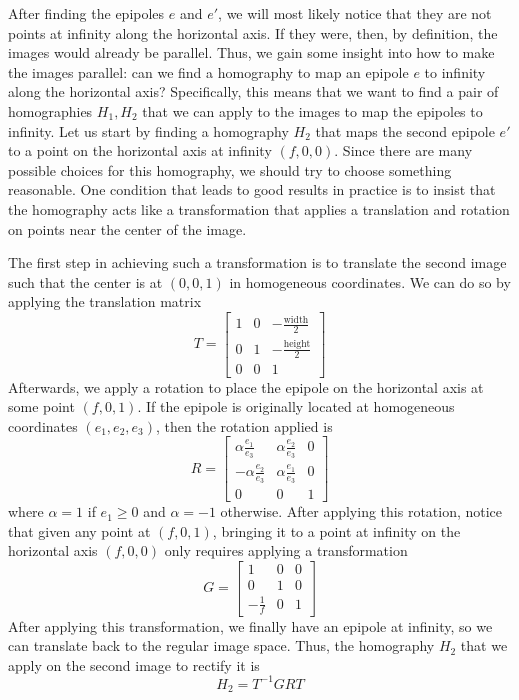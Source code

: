 \documentclass[a4paper, 12pt]{article}
\begin{document}
After finding the epipoles $e$ and $e'$, we will most likely notice that they are not points at infinity along the horizontal axis. If they were, then, by definition, the images would already be parallel. Thus, we gain some insight into how to make the images parallel: can we find a homography to map an epipole $e$ to infinity along the horizontal axis? Specifically, this means that we want to find a pair of homographies $H_1, H_2$ that we can apply to the images to map the epipoles to infinity. Let us start by finding a homography $H_2$ that maps the second epipole $e'$ to a  point on the horizontal axis at infinity $(f,0,0)$. Since there are many possible choices for this homography, we should try to choose something reasonable. One condition that leads to good results in practice is to insist that the homography acts like a transformation that applies a translation and rotation on points near the center of the image. 

The first step in achieving such a transformation is to translate the second image such that the center is at $(0,0,1)$ in homogeneous coordinates. We can do so by applying the translation matrix
\begin{equation}
    T = \begin{bmatrix}
    1&0&-\frac{\mathrm{width}}{2}\\0&1&-\frac{\mathrm{height}}{2}\\ 0 &0 &1
    \end{bmatrix}
\end{equation}
Afterwards, we apply a rotation to place the epipole on the horizontal axis at some point $(f,0,1)$. If the epipole is originally located at homogeneous coordinates $(e_1, e_2, e_3)$, then the rotation applied is
\begin{equation}
    R = 
    \begin{bmatrix}
    \alpha\frac{e_1}{e_3} & \alpha\frac{e_2}{e_3} & 0 \\ -\alpha\frac{e_2}{e_3} &\alpha \frac{e_1}{e_3} & 0\\ 0&0&1
    \end{bmatrix}
\end{equation}
where $\alpha=1$ if $e_1\geq 0$ and $\alpha=-1$ otherwise. After applying this rotation, notice that given any point at $(f,0,1)$, bringing it to a point at infinity on the horizontal axis $(f,0,0)$ only requires applying a transformation
\begin{equation}
    G =
    \begin{bmatrix}
    1 & 0 &0 \\ 0 & 1 & 0 \\ -\frac{1}{f} & 0 & 1
    \end{bmatrix}
\end{equation}
After applying this transformation, we finally have an epipole at infinity, so we can translate back to the regular image space. Thus, the homography $H_2$ that we apply on the second image to rectify it is 
\begin{equation}
    H_2 = T^{-1}GRT 
\end{equation}
\end{document}
